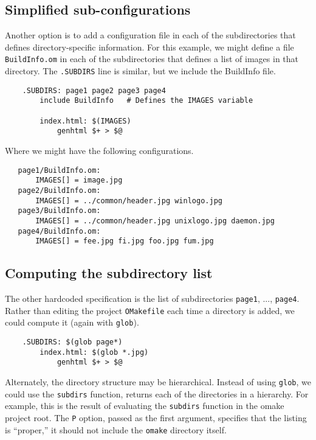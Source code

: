 \subsection{Simplified sub-configurations}

Another option is to add a configuration file in each of the subdirectories that defines
directory-specific information.  For this example, we might define a file \verb+BuildInfo.om+ in
each of the subdirectories that defines a list of images in that directory.  The \verb+.SUBDIRS+
line is similar, but we include the BuildInfo file.

\begin{verbatim}
    .SUBDIRS: page1 page2 page3 page4
        include BuildInfo   # Defines the IMAGES variable

        index.html: $(IMAGES)
            genhtml $+ > $@
\end{verbatim}

Where we might have the following configurations.

\begin{verbatim}
   page1/BuildInfo.om:
       IMAGES[] = image.jpg
   page2/BuildInfo.om:
       IMAGES[] = ../common/header.jpg winlogo.jpg
   page3/BuildInfo.om:
       IMAGES[] = ../common/header.jpg unixlogo.jpg daemon.jpg
   page4/BuildInfo.om:
       IMAGES[] = fee.jpg fi.jpg foo.jpg fum.jpg
\end{verbatim}

\subsection{Computing the subdirectory list}

The other hardcoded specification is the list of subdirectories \verb+page1+, ..., \verb+page4+.
Rather than editing the project \verb+OMakefile+ each time a directory is added, we could compute it
(again with \verb+glob+).

\begin{verbatim}
    .SUBDIRS: $(glob page*)
        index.html: $(glob *.jpg)
            genhtml $+ > $@
\end{verbatim}

Alternately, the directory structure may be hierarchical.  Instead of using \verb+glob+, we could
use the \verb+subdirs+ function, returns each of the directories in a hierarchy.  For example, this
is the result of evaluating the \verb+subdirs+ function in the omake project root.  The \verb+P+
option, passed as the first argument, specifies that the listing is ``proper,'' it should not
include the \verb+omake+ directory itself.

